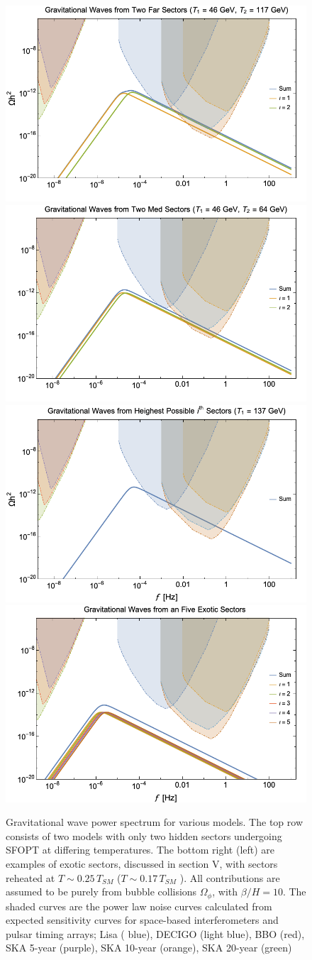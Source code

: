 \documentclass[nofootinbib,twocolumn,preprintnumbers]{revtex4-1}
\begin{document}
\begin{figure}[tb]
\centering
\begin{minipage}[c]{\textwidth}
\includegraphics[width=.45\textwidth]{TwoFar.png} 
\hfill
\includegraphics[width=.45\textwidth]{TwoMed.png} 
\hfill
\includegraphics[width=.45\textwidth ]{highest.png}
\hfill
\includegraphics[width=.45\textwidth]{energydensity.png} 
\end{minipage}
\hfill
\caption{ Gravitational wave power spectrum for various models. The top row consists of two models with only two hidden sectors undergoing SFOPT at differing temperatures. The bottom right (left) are examples of exotic sectors, discussed in section V, with sectors reheated at $T \sim 0.25\,T_{SM}$ ($T \sim 0.17\,T_{SM}$ ). All contributions are assumed to be purely from bubble collisions $\Omega_{\phi}$, with $\beta/H  = 10$.  The shaded curves are the power law noise curves calculated from expected sensitivity curves for space-based interferometers and pulsar timing arrays; Lisa ( blue), DECIGO (light blue), BBO (red), SKA 5-year (purple), SKA 10-year (orange), SKA 20-year (green)   }
\label{fig:Haa}
\end{figure}
\end{document}
